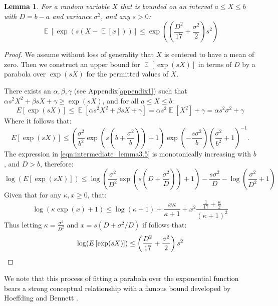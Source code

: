 \documentclass[]{interact}
\DeclareMathOperator{\E}{\mathbb{E}}
\theoremstyle{plain}%
\newtheorem{lemma}[Theorem]{Lemma}
\theoremstyle{definition}
\theoremstyle{remark}
\begin{document}
\begin{lemma}\label{expectation1}
For a random variable $X$ that is bounded on an interval $a\le X\le b$ with $D=b-a$ and variance $\sigma^2$, and any $s>0$:
\[
\E\left[\exp(s(X-\E[x]))\right] 
\le\exp\left(\left(\frac{D^2}{17}+\frac{\sigma^2}{2}\right)s^2\right)
\nonumber
\]
\end{lemma}
\begin{proof}

We assume without loss of generality that $X$ is centered to have a mean of zero.
Then we construct an upper bound for $\E\left[\exp(sX)\right]$ in terms of $D$ by a parabola over $\exp(sX)$ for the permitted values of $X$.

There exists an $\alpha,\beta,\gamma$ (see Appendix\ref{appendix1}) such that $\alpha s^2X^2+\beta sX+\gamma\ge \exp(sX)$, and for all $a\le X\le b$:
\[
E\left[\exp(sX)\right] \le \E[\alpha s^2X^2+\beta sX+\gamma] = \alpha s^2\E[X^2]+\gamma = \alpha s^2\sigma^2+\gamma
\nonumber\]
Where it follows that:
\begin{equation}\label{eqn:intermediate_lemma3.5}
E\left[\exp(sX)\right] \le\left(\frac{\sigma^2}{b^2}\exp\left(s\left(b+\frac{\sigma^2}{b}\right)\right) + 1\right)\exp\left(-\frac{s\sigma^2}{b}\right)\left(\frac{\sigma^2}{b^2} + 1\right)^{-1}.
\nonumber 
\end{equation}
The expression in \eqref{eqn:intermediate_lemma3.5} is monotonically increasing with $b$, and $D>b$, therefore:
\begin{equation}\label{eq:part1}
\log(E\left[\exp(sX)\right]) \le \log\left(\frac{\sigma^2}{D^2}\exp\left(s\left(D+\frac{\sigma^2}{D}\right)\right) + 1\right)-\frac{s\sigma^2}{D} - \log\left(\frac{\sigma^2}{D^2} + 1\right)
\end{equation}
Given that for any $\kappa,x\ge 0$, that: 
\begin{equation}\label{eq:part2}
\log(\kappa\exp(x)+1)\le\log(\kappa+1)+\frac{x\kappa}{\kappa+1}+x^2\frac{\frac{1}{17}+\frac{\kappa}{2}}{(\kappa+1)^2}
\end{equation}
Thus letting $\kappa=\frac{\sigma^2}{D^2}$ and $x=s(D+\sigma^2/D)$ if follows that:
\begin{equation}\label{eq:part3}
\log(E\left[\exp(sX)\right]) \le \left(\frac{D^2}{17}+\frac{\sigma^2}{2}\right)s^2\qedhere
\end{equation}
\end{proof}

We note that this process of fitting a parabola over the exponential function bears a strong conceptual relationship with a famous bound developed by Hoeffding \cite{hoeffding1} and Bennett \cite{10.2307/2282438}.
\end{document}
